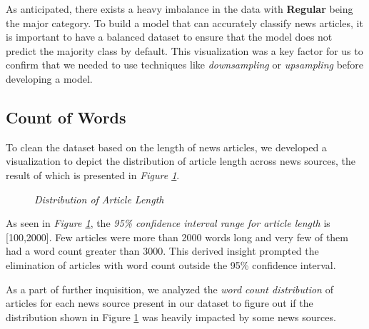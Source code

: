 \documentclass[11pt]{article}
\begin{document}
As anticipated, there exists a heavy imbalance in the data with \textbf{Regular} being the major category. To build a model that can accurately classify news articles, it is important to have a balanced dataset to ensure that the model does not predict the majority class by default. This visualization was a key factor for us to confirm that we needed to use techniques like \textit{downsampling} or \textit{upsampling} before developing a model.

\subsection{Count of Words}
 To clean the dataset based on the length of news articles, we developed a visualization to depict the distribution of article length across news sources, the result of which is presented in \textit{Figure \ref{fig:d3}}.
 
 \begin{figure}[!htb]
\caption{\label{fig:d3}  \textit{Distribution of Article Length}}
\end{figure}
 
 As seen in \textit{Figure \ref{fig:d3}}, the \textit{95\% confidence interval range for article length} is [100,2000]. Few articles were more than 2000 words long and very few of them had a word count greater than 3000. This derived insight prompted the elimination of articles with word count outside the 95\% confidence interval.
 
  As a part of further inquisition, we analyzed the \textit{word count distribution} of articles for each news source present in our dataset to figure out if the distribution shown in Figure \ref{fig:d3} was heavily impacted by some news sources.
 
\end{document}
